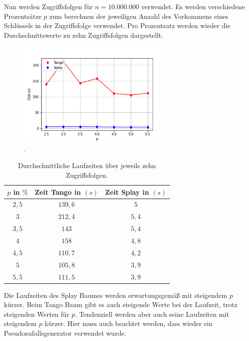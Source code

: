 \documentclass[a4paper,12pt]{article}
\begin{document}
\noindent Nun werden Zugriffsfolgen für $n = 10.000.000$ verwendet. Es werden verschiedene Prozentsätze $p$ zum berechnen der jeweiligen Anzahl des Vorkommens eines Schlüssels in der Zugriffsfolge verwendet. Pro Prozentsatz werden wieder die Durchschnittswerte zu zehn Zugriffsfolgen dargestellt. 
\begin{figure}[H]
	\centering
	\includegraphics[width=0.7\textwidth]{"Medien/laufzeittest/diagramm/staticfinger4"}
	\caption{.}
\end{figure}
\begin{table}[H]
	\begin{center}
		\begin{tabular}[c]{|c|c|c|}
			\hline
			$p$ in $\%$ & Zeit Tango in $\left(s\right)$ &Zeit Splay in $\left(s\right)$ \\
			\hline
			$2,5$  & $139,6$ &$5$  \\
			\hline
			$3$  &   $212,4$ &  $5,4$  \\
			\hline
			$3,5$  & $143$ &$5,4$  \\
			\hline
			$4$ &    $158$ &$4,8$ \\
			\hline
			$4,5$  & $110,7$ &$4,2$  \\
			\hline
			$5$  &   $105,8$ &  $3,9$  \\
			\hline
			$5,5$  & $111,5$ &$3,9$  \\
			\hline
		\end{tabular}
		\caption{Durchschnittliche Laufzeiten über jeweils zehn Zugriffsfolgen.} 
	\end{center}
\end{table}

\noindent Die Laufzeiten des Splay Baumes werden erwartungsgemäß mit steigendem $p$ kürzer. Beim Tango Baum gibt es auch steigende Werte bei der Laufzeit, trotz steigenden Werten für $p$. Tendenziell werden aber auch seine Laufzeiten mit steigendem $p$ kürzer. Hier muss auch beachtet werden, dass wieder ein Pseudozufallsgenerator verwendet wurde.
\end{document}
